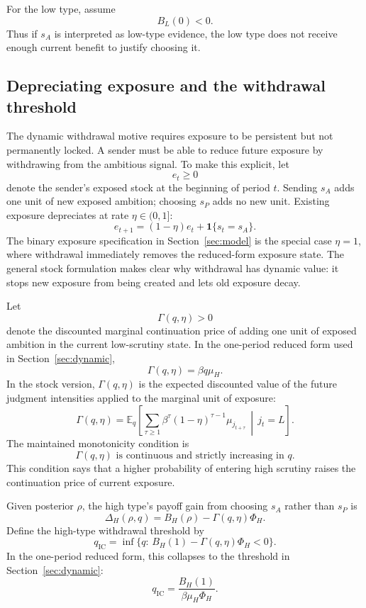 For the low type, assume
\[
B_L(0)<0.
\]
Thus if \(s_A\) is interpreted as low-type evidence, the low type does not receive enough current benefit to justify choosing it.

\subsection{Depreciating exposure and the withdrawal threshold}
\label{subsec:depreciating-exposure}

The dynamic withdrawal motive requires exposure to be persistent but not permanently locked. A sender must be able to reduce future exposure by withdrawing from the ambitious signal. To make this explicit, let
\[
e_t\ge 0
\]
denote the sender's exposed stock at the beginning of period \(t\). Sending \(s_A\) adds one unit of new exposed ambition; choosing \(s_P\) adds no new unit. Existing exposure depreciates at rate \(\eta \in (0,1]\):
\[
e_{t+1}=(1-\eta)e_t+\mathbf{1}\{s_t=s_A\}.
\]
The binary exposure specification in Section~\ref{sec:model} is the special case \(\eta=1\), where withdrawal immediately removes the reduced-form exposure state. The general stock formulation makes clear why withdrawal has dynamic value: it stops new exposure from being created and lets old exposure decay.

Let
\[
\Gamma(q,\eta)>0
\]
denote the discounted marginal continuation price of adding one unit of exposed ambition in the current low-scrutiny state. In the one-period reduced form used in Section~\ref{sec:dynamic},
\[
\Gamma(q,\eta)=\beta q\mu_H.
\]
In the stock version, \(\Gamma(q,\eta)\) is the expected discounted value of the future judgment intensities applied to the marginal unit of exposure:
\[
\Gamma(q,\eta)
=
\mathbb E_q\left[
\sum_{\tau\ge 1}
\beta^\tau (1-\eta)^{\tau-1}\mu_{j_{t+\tau}}
\,\middle|\,j_t=L
\right].
\]
The maintained monotonicity condition is
\[
\Gamma(q,\eta)\text{ is continuous and strictly increasing in }q.
\]
This condition says that a higher probability of entering high scrutiny raises the continuation price of current exposure.

Given posterior \(\rho\), the high type's payoff gain from choosing \(s_A\) rather than \(s_P\) is
\[
\Delta_H(\rho,q)
=
B_H(\rho)-\Gamma(q,\eta)\Phi_H.
\]
Define the high-type withdrawal threshold by
\[
q_{\mathrm{IC}}
=
\inf\{q:\,B_H(1)-\Gamma(q,\eta)\Phi_H<0\}.
\]
In the one-period reduced form, this collapses to the threshold in Section~\ref{sec:dynamic}:
\[
q_{\mathrm{IC}}
=
\frac{B_H(1)}{\beta\mu_H\Phi_H}.
\]


